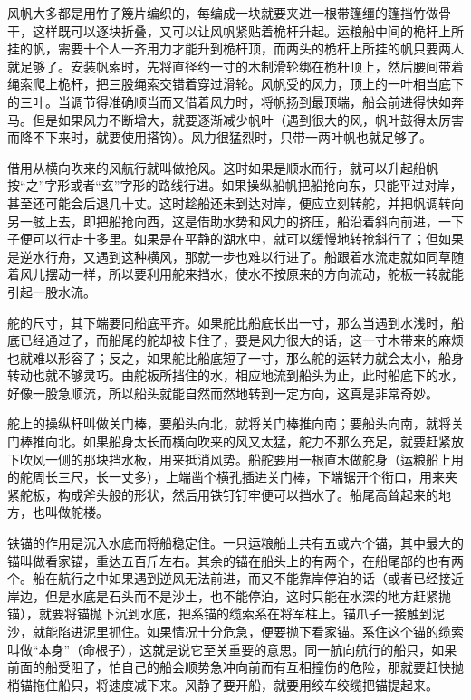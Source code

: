 \documentclass[12pt,UTF8]{ctexbook}
\begin{document}
风帆大多都是用竹子篾片编织的，每编成一块就要夹进一根带篷缰的篷挡竹做骨干，这样既可以逐块折叠，又可以让风帆紧贴着桅杆升起。运粮船中间的桅杆上所挂的帆，需要十个人一齐用力才能升到桅杆顶，而两头的桅杆上所挂的帆只要两人就足够了。安装帆索时，先将直径约一寸的木制滑轮绑在桅杆顶上，然后腰间带着绳索爬上桅杆，把三股绳索交错着穿过滑轮。风帆受的风力，顶上的一叶相当底下的三叶。当调节得准确顺当而又借着风力时，将帆扬到最顶端，船会前进得快如奔马。但是如果风力不断增大，就要逐渐减少帆叶（遇到很大的风，帆叶鼓得太厉害而降不下来时，就要使用搭钩）。风力很猛烈时，只带一两叶帆也就足够了。

借用从横向吹来的风航行就叫做抢风。这时如果是顺水而行，就可以升起船帆按“之”字形或者“玄”字形的路线行进。如果操纵船帆把船抢向东，只能平过对岸，甚至还可能会后退几十丈。这时趁船还未到达对岸，便应立刻转舵，并把帆调转向另一舷上去，即把船抢向西，这是借助水势和风力的挤压，船沿着斜向前进，一下子便可以行走十多里。如果是在平静的湖水中，就可以缓慢地转抢斜行了；但如果是逆水行舟，又遇到这种横风，那就一步也难以行进了。船跟着水流走就如同草随着风儿摆动一样，所以要利用舵来挡水，使水不按原来的方向流动，舵板一转就能引起一股水流。

舵的尺寸，其下端要同船底平齐。如果舵比船底长出一寸，那么当遇到水浅时，船底已经通过了，而船尾的舵却被卡住了，要是风力很大的话，这一寸木带来的麻烦也就难以形容了；反之，如果舵比船底短了一寸，那么舵的运转力就会太小，船身转动也就不够灵巧。由舵板所挡住的水，相应地流到船头为止，此时船底下的水，好像一股急顺流，所以船头就能自然而然地转到一定方向，这真是非常奇妙。

舵上的操纵杆叫做关门棒，要船头向北，就将关门棒推向南；要船头向南，就将关门棒推向北。如果船身太长而横向吹来的风又太猛，舵力不那么充足，就要赶紧放下吹风一侧的那块挡水板，用来抵消风势。船舵要用一根直木做舵身（运粮船上用的舵周长三尺，长一丈多），上端凿个横孔插进关门棒，下端锯开个衔口，用来夹紧舵板，构成斧头般的形状，然后用铁钉钉牢便可以挡水了。船尾高耸起来的地方，也叫做舵楼。

铁锚的作用是沉入水底而将船稳定住。一只运粮船上共有五或六个锚，其中最大的锚叫做看家锚，重达五百斤左右。其余的锚在船头上的有两个，在船尾部的也有两个。船在航行之中如果遇到逆风无法前进，而又不能靠岸停泊的话（或者已经接近岸边，但是水底是石头而不是沙土，也不能停泊，这时只能在水深的地方赶紧抛锚），就要将锚抛下沉到水底，把系锚的缆索系在将军柱上。锚爪子一接触到泥沙，就能陷进泥里抓住。如果情况十分危急，便要抛下看家锚。系住这个锚的缆索叫做“本身”（命根子），这就是说它至关重要的意思。同一航向航行的船只，如果前面的船受阻了，怕自己的船会顺势急冲向前而有互相撞伤的危险，那就要赶快抛梢锚拖住船只，将速度减下来。风静了要开船，就要用绞车绞缆把锚提起来。
\end{document}
